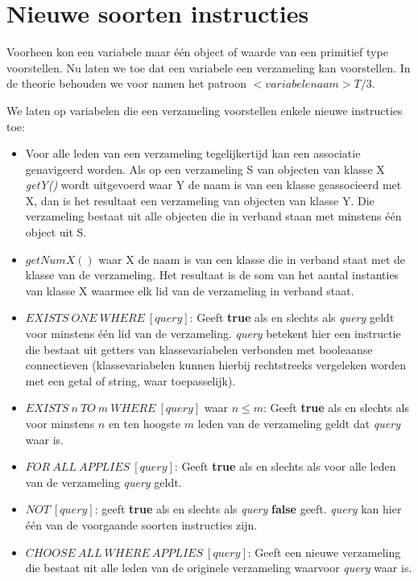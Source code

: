 \section{Nieuwe soorten instructies}

Voorheen kon een variabele maar \'e\'en object of waarde van een primitief type voorstellen. Nu laten we toe dat een variabele een verzameling kan voorstellen. In de theorie behouden we voor namen het patroon $<variabelenaam>T/3$.

We laten op variabelen die een verzameling voorstellen enkele nieuwe instructies toe:

\begin{itemize}
	\item Voor alle leden van een verzameling tegelijkertijd kan een associatie genavigeerd worden. Als op een verzameling S van objecten van klasse X \textit{getY()} wordt uitgevoerd waar Y de naam is van een klasse geassocieerd met X, dan is het resultaat een verzameling van objecten van klasse Y. Die verzameling bestaat uit alle objecten die in verband staan met minstens \'e\'en object uit S.
	\item $getNumX()$ waar X de naam is van een klasse die in verband staat met de klasse van de verzameling. Het resultaat is de som van het aantal instanties van klasse X waarmee elk lid van de verzameling in verband staat.
	\item $EXISTS\ ONE\ WHERE\ [query]$: Geeft \textbf{true} als en slechts als \textit{query} geldt voor minstens \'e\'en lid van de verzameling. \textit{query} betekent hier een instructie die bestaat uit getters van klassevariabelen verbonden met booleaanse connectieven (klassevariabelen kunnen hierbij rechtstreeks vergeleken worden met een getal of string, waar toepasselijk).
	\item $EXISTS\ n\ TO\ m\ WHERE\ [query]$ waar $n \leq m$: Geeft \textbf{true} als en slechts als voor minstens $n$ en ten hoogste $m$ leden van de verzameling geldt dat \textit{query} waar is.
	\item $FOR\ ALL\ APPLIES\ [query]$: Geeft \textbf{true} als en slechts als voor alle leden van de verzameling \textit{query} geldt.
	\item $NOT\ [query]$: geeft \textbf{true} als en slechts als \textit{query} \textbf{false} geeft. \textit{query} kan hier \'e\'en van de voorgaande soorten instructies zijn.
	\item $CHOOSE\ ALL\ WHERE\ APPLIES\ [query]$: Geeft een nieuwe verzameling die bestaat uit alle leden van de originele verzameling waarvoor \textit{query} waar is.

\end{itemize}
